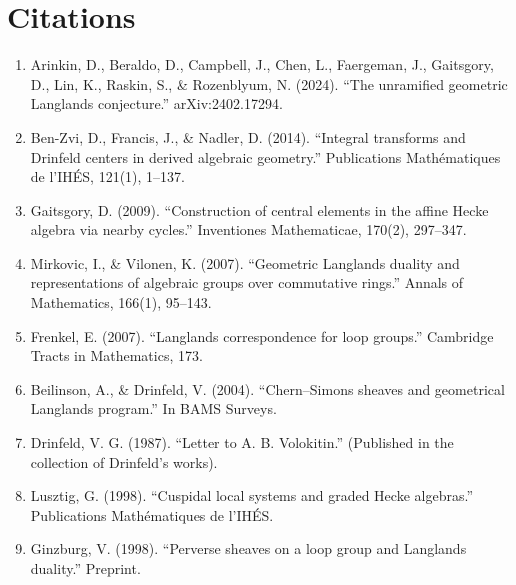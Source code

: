 \section{Citations}

\begin{enumerate}
\item Arinkin, D., Beraldo, D., Campbell, J., Chen, L., Faergeman, J., Gaitsgory, D., Lin, K., Raskin, S., \& Rozenblyum, N. (2024). ``The unramified geometric Langlands conjecture.'' arXiv:2402.17294.
\item Ben-Zvi, D., Francis, J., \& Nadler, D. (2014). ``Integral transforms and Drinfeld centers in derived algebraic geometry.'' Publications Math\'ematiques de l'IH\'ES, 121(1), 1--137.
\item Gaitsgory, D. (2009). ``Construction of central elements in the affine Hecke algebra via nearby cycles.'' Inventiones Mathematicae, 170(2), 297--347.
\item Mirkovic, I., \& Vilonen, K. (2007). ``Geometric Langlands duality and representations of algebraic groups over commutative rings.'' Annals of Mathematics, 166(1), 95--143.
\item Frenkel, E. (2007). ``Langlands correspondence for loop groups.'' Cambridge Tracts in Mathematics, 173.
\item Beilinson, A., \& Drinfeld, V. (2004). ``Chern--Simons sheaves and geometrical Langlands program.'' In BAMS Surveys.
\item Drinfeld, V. G. (1987). ``Letter to A. B. Volokitin.'' (Published in the collection of Drinfeld's works).
\item Lusztig, G. (1998). ``Cuspidal local systems and graded Hecke algebras.'' Publications Math\'ematiques de l'IH\'ES.
\item Ginzburg, V. (1998). ``Perverse sheaves on a loop group and Langlands duality.'' Preprint.
\end{enumerate}